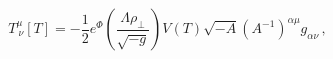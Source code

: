 \begin{equation}\label{brane_stress_one}
T^{\mu}_{\ \nu}[T] = - {\frac{1}{2}}
e^{\Phi}\left({\frac{\Lambda\rho_{\perp}}{\sqrt{-g}}}\right) V(T)
\sqrt{-A}(A^{-1})^{\alpha\mu}g_{\alpha\nu} \, ,
\end{equation}

